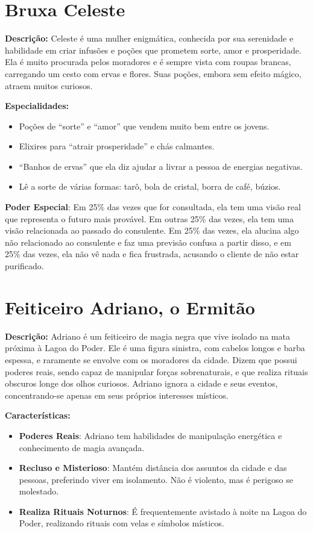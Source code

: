\section{Bruxa Celeste}
\textbf{Descrição:}  
Celeste é uma mulher enigmática, conhecida por sua serenidade e habilidade em criar infusões e poções que prometem sorte, amor e prosperidade. Ela é muito procurada pelos moradores e é sempre vista com roupas brancas, carregando um cesto com ervas e flores. Suas poções, embora sem efeito mágico, atraem muitos curiosos.

\textbf{Especialidades:}  
\begin{itemize}
    \item Poções de ``sorte'' e ``amor'' que vendem muito bem entre os jovens.
    \item Elixires para ``atrair prosperidade'' e chás calmantes.
    \item ``Banhos de ervas'' que ela diz ajudar a livrar a pessoa de energias negativas.
    \item Lê a sorte de várias formas: tarô, bola de cristal, borra de café, búzios.
\end{itemize}

\textbf{Poder Especial}: Em 25\% das vezes que for consultada, ela tem uma visão real que representa o futuro mais provável. Em outras 25\% das vezes, ela tem uma visão relacionada ao passado do consulente. Em 25\% das vezes, ela alucina algo não relacionado ao consulente e faz uma previsão confusa a partir disso, e em 25\% das vezes, ela não vê nada e fica frustrada, acusando o cliente de não estar purificado.


\section{Feiticeiro Adriano, o Ermitão}

\textbf{Descrição:}  
Adriano é um feiticeiro de magia negra que vive isolado na mata próxima à Lagoa do Poder. Ele é uma figura sinistra, com cabelos longos e barba espessa, e raramente se envolve com os moradores da cidade. Dizem que possui poderes reais, sendo capaz de manipular forças sobrenaturais, e que realiza rituais obscuros longe dos olhos curiosos. Adriano ignora a cidade e seus eventos, concentrando-se apenas em seus próprios interesses místicos.

\textbf{Características:}  
\begin{itemize}
    \item \textbf{Poderes Reais}: Adriano tem habilidades de manipulação energética e conhecimento de magia avançada.
    \item \textbf{Recluso e Misterioso}: Mantém distância dos assuntos da cidade e das pessoas, preferindo viver em isolamento. Não é violento, mas é perigoso se molestado.
    \item \textbf{Realiza Rituais Noturnos}: É frequentemente avistado à noite na Lagoa do Poder, realizando rituais com velas e símbolos místicos.
\end{itemize}

